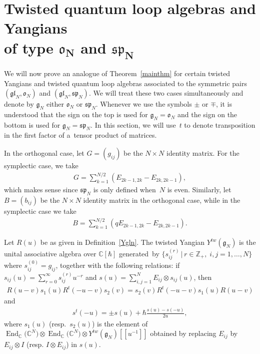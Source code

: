 \documentclass[pdftex]{sigma}
\numberwithin{theorem}{section}
\numberwithin{proposition}{section}
\numberwithin{lemma}{section}
\numberwithin{corollary}{section}
\numberwithin{definition}{section}
\numberwithin{example}{section}
\numberwithin{remark}{section}
\numberwithin{note}{section}
\DeclareMathOperator{\End}{End}
\numberwithin{equation}{section}
\begin{document}
\section[Twisted quantum loop algebras and Yangians of type $\mathfrak{o}_N$ and $\mathfrak{sp}_N$]{Twisted quantum loop algebras and Yangians\\ of type $\boldsymbol{\mathfrak{o}_N}$ and $\boldsymbol{\mathfrak{sp}_N}$}
\label{twsec}
We will now prove an analogue of Theorem~\ref{mainthm} for certain twisted Yangians and twisted quantum loop algebras
associated to the symmetric pairs $(\mathfrak{gl}_N,\mathfrak{o}_N)$ and
$(\mathfrak{gl}_N,\mathfrak{sp}_N)$.
We will treat these two cases simultaneously and denote by $\mathfrak{g}_N$ either $\mathfrak{o}_N$ or
$\mathfrak{sp}_N$.
Whenever we use the symbols $\pm$ or $\mp$, it is understood that the sign on the top is used for
$\mathfrak{g}_N=\mathfrak{o}_N$ and the sign on the bottom is used for $\mathfrak{g}_N=\mathfrak{sp}_N$.
In this section, we will use~$t$ to denote transposition in the f\/irst factor of a~tensor product of matrices.

In the orthogonal case, let $G=(g_{ij})$ be the $N \times N$ identity matrix.
For the symplectic case, we take
\begin{gather*}
G=\sum\limits_{k=1}^{N/2} (E_{2k-1,2k}-E_{2k,2k-1}),
\end{gather*}
which makes sense since $\mathfrak{sp}_N$ is only def\/ined when~$N$ is even.
Similarly, let $B=(b_{ij})$ be the $N \times N$ identity matrix in the orthogonal case, while in the symplectic case we
take
\begin{gather*}
B=\sum\limits_{k=1}^{N/2} (qE_{2k-1,2k}-E_{2k,2k-1}).
\end{gather*}

\begin{definition}
\label{Ytw}
Let $R(u)$ be as given in Def\/inition~\ref{Ygln}.
The twisted Yangian $Y^{tw}(\mathfrak{g}_N)$ is the unital associative algebra over $\mathbb{C}[\hbar]$ generated~by
$\big\{s_{ij}^{(r)} \,|\, r\in\mathbb{Z}_+,\; i,j=1,\ldots,N\big\}$ where $s_{ij}^{(0)}=g_{ij}$, together with the following
relations: if $s_{ij}(u)=\sum\limits_{r=0}^\infty s_{ij}^{(r)}u^{-r}$ and $s(u)=\sum\limits_{i,j=1}^N E_{ij} \otimes
s_{ij}(u)$, then
\begin{gather*}
R(u-v)s_1(u)R^t(-u-v)s_2(v)=s_2(v)R^t(-u-v)s_1(u)R(u-v)
\end{gather*}
and
\begin{gather*}
s^t(-u)= \pm s(u) + \hbar\frac{s(u)-s(-u)}{2u},
\end{gather*}
where $s_1(u)$ (resp.\
$s_2(u)$) is the element of $\End_{\mathbb{C}}\big(\mathbb{C}^N\big) \otimes \End_{\mathbb{C}}\big(\mathbb{C}^N\big) \otimes
Y^{tw}(\mathfrak{g}_N)[[u^{-1}]]$ obtained by replacing $E_{ij}$ by $E_{ij} \otimes I$ (resp.
$I \otimes E_{ij}$) in $s(u)$.
\end{definition}
\end{document}
